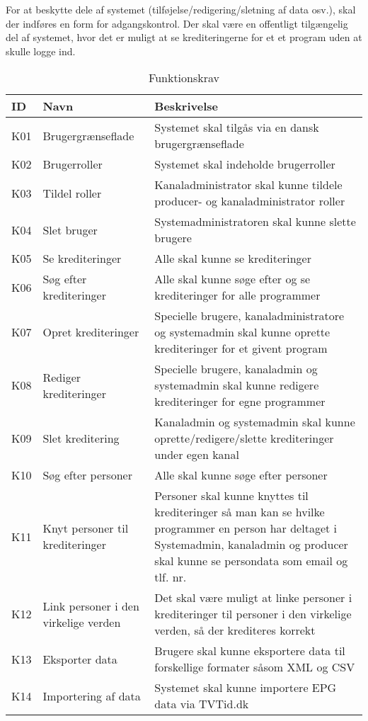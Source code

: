 \noindent
For at beskytte dele af systemet (tilføjelse/redigering/sletning af data osv.), skal der indføres en form for adgangskontrol. Der skal være en offentligt tilgængelig del af systemet, hvor det er muligt at se krediteringerne for et et program uden at skulle logge ind.
\begin{center}
\begin{table}
\begin{tabular}{ |p{1cm}|p{3.5cm}|p{7cm}| }
\hline
\textbf{ID} & \textbf{Navn} & \textbf{Beskrivelse} \\
\hline
K01 & Brugergrænseflade & Systemet skal tilgås via en dansk brugergrænseflade \\
\hline
K02 & Brugerroller & Systemet skal indeholde brugerroller \\
\hline
\label{K03}K03 & Tildel roller & Kanaladministrator skal kunne tildele producer- og kanaladministrator roller \\
\hline
K04 & Slet bruger & Systemadministratoren skal kunne slette brugere \\
\hline
K05 & Se krediteringer & Alle skal kunne se krediteringer \\
\hline
K06 & Søg efter krediteringer & Alle skal kunne søge efter og se krediteringer for alle programmer \\
\hline
K07 & Opret krediteringer & Specielle brugere, kanaladministratore og systemadmin skal kunne oprette
krediteringer for et givent program \\
\hline
K08 & Rediger krediteringer & Specielle brugere, kanaladmin og systemadmin skal kunne redigere krediteringer for egne programmer \\
\hline
K09 & Slet kreditering & Kanaladmin og systemadmin skal kunne oprette/redigere/slette krediteringer under egen kanal \\
\hline
K10 & Søg efter personer & Alle skal kunne søge efter personer \\
\hline
K11 & Knyt personer til krediteringer & Personer skal kunne knyttes til krediteringer så man kan se hvilke programmer en person har deltaget i Systemadmin, kanaladmin og producer skal kunne se persondata som email og tlf. nr. \\
\hline
K12 & Link personer i den virkelige verden & Det skal være muligt at linke personer i krediteringer til personer i den virkelige verden, så der krediteres korrekt \\
\hline
K13 & Eksporter data & Brugere skal kunne eksportere data til forskellige formater såsom XML og CSV \\
\hline
K14 & Importering af data & Systemet skal kunne importere EPG data via TVTid.dk \\
\hline
\end{tabular} 
\caption{Funktionskrav}
\label{table:funktionskrav}
\end{table}
\end{center}

